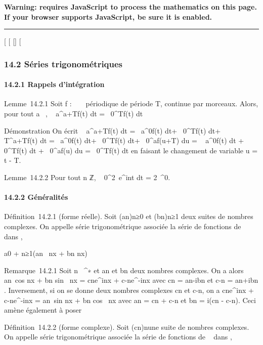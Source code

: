 \textbf{Warning: 
requires JavaScript to process the mathematics on this page.\\ If your
browser supports JavaScript, be sure it is enabled.}

\begin{center}\rule{3in}{0.4pt}\end{center}

{[}
{[}
{[}{]}
{[}

\subsubsection{14.2 Séries trigonométriques}

\paragraph{14.2.1 Rappels d'intégration}

Lemme~14.2.1 Soit f : ~ \rightarrow~  périodique de période T, continue par
morceaux. Alors, pour tout a \in {}~, \int ~
a^a+Tf(t) dt =\int ~
0^Tf(t) dt

Démonstration On écrit \int ~
a^a+Tf(t) dt =\int ~
a^0f(t) dt+\int ~
0^Tf(t) dt+\int ~
T^a+Tf(t) dt =\int ~
a^0f(t) dt+\int ~
0^Tf(t) dt+\int ~
0^af(u+T) du = \int ~
a^0f(t) dt +\int ~
0^Tf(t) dt +\int ~
0^af(u) du =\int ~
0^Tf(t) dt en faisant le changement de variable u = t -
T.

Lemme~14.2.2 Pour tout n \in ℤ, \int ~
0^2\pi~e^int dt = 2\pi~\deltan^0.

\paragraph{14.2.2 Généralités}

Définition~14.2.1 (forme réelle). Soit (an)n≥0 et
(bn)n≥1 deux suites de nombres complexes. On appelle
série trigonométrique associée la série de fonctions de ~ dans ,

a0 + \sum n≥1(an~
\cos nx + bn \sin nx)

Remarque~14.2.1 Soit n \in {}~^∗ et an et bn
deux nombres complexes. On a alors an\
cos nx + bn sin~ nx =
cne^inx + c-ne^-inx avec
cn = an-ibn  et
c-n = an+ibn \over 2 .
Inversement, si on se donne deux nombres complexes cn et
c-n, on a cne^inx +
c-ne^-inx = an\
sin nx + bn cos~ nx avec
an = cn + c-n et bn =
i(cn - c-n). Ceci amène également à poser

Définition~14.2.2 (forme complexe). Soit (cn)n une
suite de nombres complexes. On appelle série trigonométrique associée la
série de fonctions de \mathbb{R}~ dans \mathbb{C},

